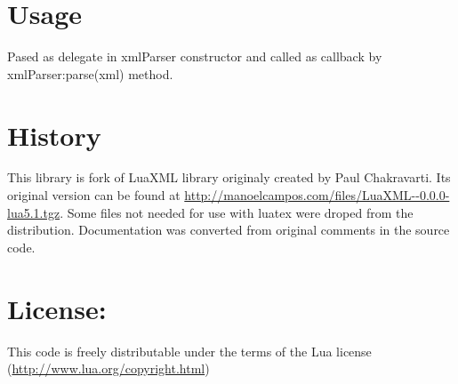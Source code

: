 \documentclass{ltxdoc}
\begin{document}
\section{Usage}

Pased as delegate in xmlParser constructor and called as callback by
xmlParser:parse(xml) method.

\section{History}

This library is fork of LuaXML library originaly created by Paul
Chakravarti. Its original version can be found at
\url{http://manoelcampos.com/files/LuaXML--0.0.0-lua5.1.tgz}. Some files not
needed for use with luatex were droped from the distribution.
Documentation was converted from original comments in the source code.

\section{License:}

This code is freely distributable under the terms of the Lua license
(\url{http://www.lua.org/copyright.html})
\end{document}
